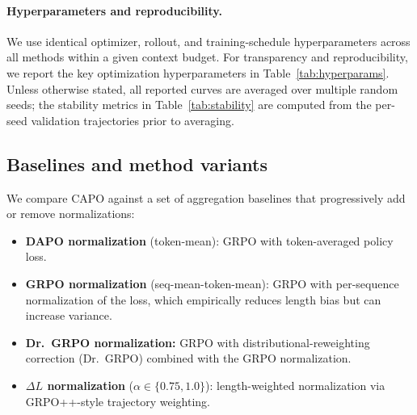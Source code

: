 \paragraph{Hyperparameters and reproducibility.}
We use identical optimizer, rollout, and training-schedule hyperparameters across all methods within a given context budget.
For transparency and reproducibility, we report the key optimization hyperparameters in Table~\ref{tab:hyperparams}.
Unless otherwise stated, all reported curves are averaged over multiple random seeds; the stability metrics in Table~\ref{tab:stability} are computed from the per-seed validation trajectories prior to averaging.

\begin{table}[t]
\centering
\small

\caption{Key optimization and rollout hyperparameters used in the CountDown RLVR experiments.
We hold these fixed across methods within a given context budget; only the advantage aggregation / normalization rule varies.}
\label{tab:hyperparams}
\end{table}

\subsection{Baselines and method variants}
We compare CAPO against a set of aggregation baselines that progressively add
or remove normalizations:
\begin{itemize}
  \item \textbf{DAPO normalization} (token-mean): GRPO with token-averaged policy
  loss.
  \item \textbf{GRPO normalization} (seq-mean-token-mean): GRPO with per-sequence
  normalization of the loss, which empirically reduces length bias but can
  increase variance.
  \item \textbf{Dr.~GRPO normalization:} GRPO with distributional-reweighting
  correction (Dr.~GRPO) combined with the GRPO normalization.
  \item \textbf{$\Delta L$ normalization} ($\alpha\in\{0.75, 1.0\}$): length-weighted
  normalization via GRPO++-style trajectory weighting.
\end{itemize}

